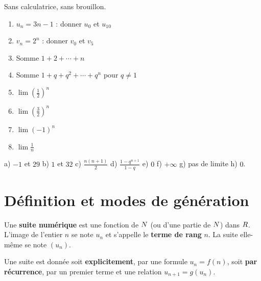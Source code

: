 \begin{automatismes}
Sans calculatrice, sans brouillon.

\begin{enumerate}[label=\textbf{\alph*)}, leftmargin=*, itemsep=0.25em]
  \item $u_{n} = 3n-1$ : donner $u_{0}$ et $u_{10}$
  \item $v_{n} = 2^{n}$ : donner $v_{0}$ et $v_{5}$
  \item Somme $1+2+\cdots+n$
  \item Somme $1+q+q^{2}+\cdots+q^{n}$ pour $q \neq 1$
  \item $\lim\left(\frac12\right)^{n}$
  \item $\lim\left(\frac32\right)^{n}$
  \item $\lim (-1)^{n}$
  \item $\lim \frac{1}{n}$
\end{enumerate}
\end{automatismes}

\begin{corrige}[automatismes]
a) $-1$ et $29$ \quad b) $1$ et $32$ \quad c) $\frac{n(n+1)}{2}$ \quad
d) $\frac{1-q^{n+1}}{1-q}$ \quad e) $0$ \quad f) $+\infty$ \quad
g) pas de limite \quad h) $0$.
\end{corrige}

\section{Définition et modes de génération}

\begin{definition}
Une \textbf{suite numérique} est une fonction de $N$ (ou d'une partie de
$N$) dans $R$. L'image de l'entier $n$ se note $u_{n}$ et s'appelle le
\textbf{terme de rang} $n$. La suite elle-même se note $(u_{n})$.
\end{definition}

\begin{propriete}
Une suite est donnée soit \textbf{explicitement}, par une formule
$u_{n} = f(n)$, soit \textbf{par récurrence}, par un premier terme et une
relation $u_{n+1} = g(u_{n})$.
\end{propriete}


